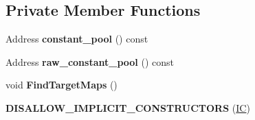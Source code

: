 \subsection*{Private Member Functions}
\begin{DoxyCompactItemize}
\item 
Address {\bfseries constant\+\_\+pool} () const \hypertarget{classv8_1_1internal_1_1_i_c_ab38f8972528da2743451f85331caad24}{}\label{classv8_1_1internal_1_1_i_c_ab38f8972528da2743451f85331caad24}

\item 
Address {\bfseries raw\+\_\+constant\+\_\+pool} () const \hypertarget{classv8_1_1internal_1_1_i_c_a9ae0b6fd944a7b99eff9c24b668f6eea}{}\label{classv8_1_1internal_1_1_i_c_a9ae0b6fd944a7b99eff9c24b668f6eea}

\item 
void {\bfseries Find\+Target\+Maps} ()\hypertarget{classv8_1_1internal_1_1_i_c_a2a9224d65359b7437a951d46dceac7d1}{}\label{classv8_1_1internal_1_1_i_c_a2a9224d65359b7437a951d46dceac7d1}

\item 
{\bfseries D\+I\+S\+A\+L\+L\+O\+W\+\_\+\+I\+M\+P\+L\+I\+C\+I\+T\+\_\+\+C\+O\+N\+S\+T\+R\+U\+C\+T\+O\+RS} (\hyperlink{classv8_1_1internal_1_1_i_c}{IC})\hypertarget{classv8_1_1internal_1_1_i_c_a7746ae7235087e09adac37d603e4019e}{}\label{classv8_1_1internal_1_1_i_c_a7746ae7235087e09adac37d603e4019e}

\end{DoxyCompactItemize}
